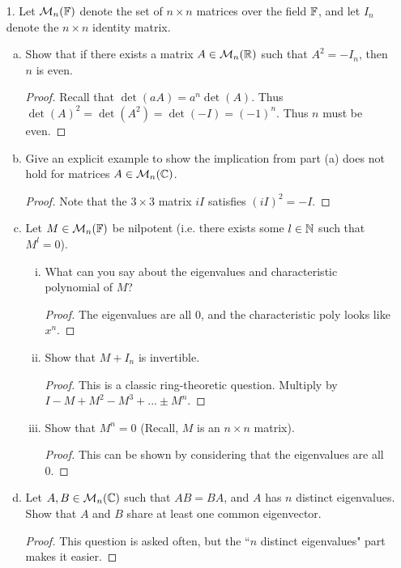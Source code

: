 
\begin{itemize}

\item[1.] Let $\mathcal{M}_n(\mathbb{F})$ denote the set of $n \times n$ matrices over the field $\mathbb{F}$, and let $I_n$ denote the
$n \times n$ identity matrix.
\begin{enumerate}[(a)]
\item Show that if there exists a matrix $A \in \mathcal{M}_n(\mathbb{R})$ such that $A^2 = -I_n$,
then $n$ is even.
\begin{proof}
Recall that $\det(aA) = a^n \det(A)$. Thus $\det(A)^2 = \det(A^2) = \det(-I) = (-1)^n$. Thus $n$ must be even.
\end{proof}


\item Give an explicit example to show the implication from part (a) does
not hold for matrices $A \in \mathcal{M}_n(\mathbb{C})$.
\begin{proof}
Note that the $3 \times 3$ matrix $iI$ satisfies $(iI)^2 = -I$.
\end{proof}


\item Let $M \in \mathcal{M}_n(\mathbb{F})$ be nilpotent (i.e. there exists some $l \in \mathbb{N}$ such that $M^l = 0$).
    \begin{enumerate}[(i)]
        \item What can you say about the eigenvalues and characteristic polynomial of $M$?
        \begin{proof}
        The eigenvalues are all 0, and the characteristic poly looks like $x^n$.
        \end{proof}
        
        \item Show that $M + I_n$ is invertible.
        \begin{proof}
        This is a classic ring-theoretic question. Multiply by $I -M + M^2 - M^3 + ... \pm M^n$.
        \end{proof}
        
        \item Show that $M^n = 0$ (Recall, $M$ is an $n \times n$ matrix).
        \begin{proof}
        This can be shown by considering that the eigenvalues are all 0.
        \end{proof}
    \end{enumerate}


\item Let $A,B \in \mathcal{M}_n(\mathbb{C})$ such that $AB = BA$, and $A$ has $n$ distinct eigenvalues. Show that $A$ and $B$ share at least one common eigenvector.
\begin{proof}
This question is asked often, but the ``$n$ distinct eigenvalues" part makes it easier.


\end{proof}
\end{enumerate}
\end{itemize}
